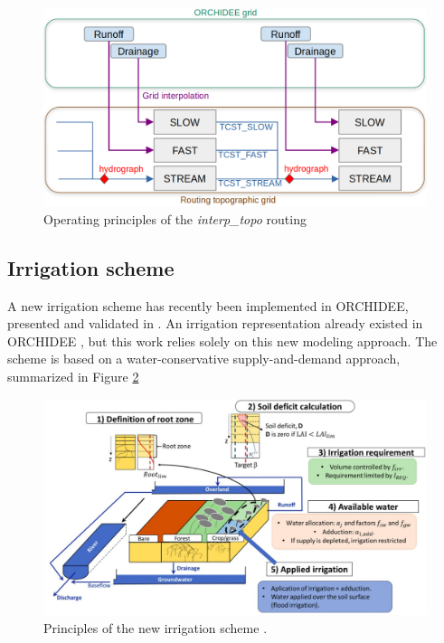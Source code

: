 \begin{figure}[ht]
    \centering
    \includegraphics[width=1\linewidth]{images/routing_structure.png}
    \caption{Operating principles of the \textit{interp\_topo} routing}
    \label{fig:routing_principles}
\end{figure}

\subsection{Irrigation scheme}

A new irrigation scheme has recently been implemented in ORCHIDEE, presented and validated in \citet{arboleda-obando_validation_2024}. An irrigation representation already existed in ORCHIDEE \citep{de_rosnay_integrated_2003, guimberteau_global_2012}, but this work relies solely on this new modeling approach. The scheme is based on a water-conservative supply-and-demand approach, summarized in Figure \ref{fig:schema_pedro}

\begin{figure}[t]
    \centering
    \includegraphics[width=1\textwidth]{images/schema_pedro.png}
    \caption{Principles of the new irrigation scheme \citep[from][]{arboleda-obando_validation_2024}.}
    \label{fig:schema_pedro}
\end{figure}

